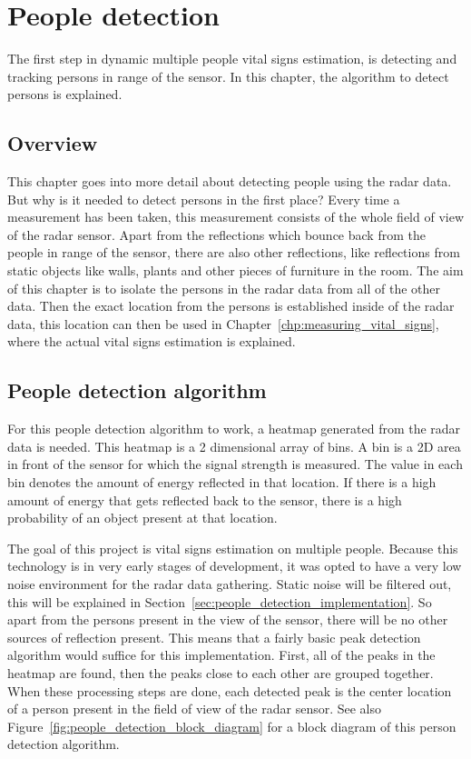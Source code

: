 \chapter{People detection}
\label{chp:people_detection}

The first step in dynamic multiple people vital signs estimation, is detecting and tracking persons in range of the sensor. In this chapter, the algorithm to detect persons is explained.

\section{Overview}
This chapter goes into more detail about detecting people using the radar data. But why is it needed to detect persons in the first place? Every time a measurement has been taken, this measurement consists of the whole field of view of the radar sensor. Apart from the reflections which bounce back from the people in range of the sensor, there are also other reflections, like reflections from static objects like walls, plants and other pieces of furniture in the room. The aim of this chapter is to isolate the persons in the radar data from all of the other data. Then the exact location from the persons is established inside of the radar data, this location can then be used in Chapter~\ref{chp:measuring_vital_signs}, where the actual vital signs estimation is explained.

\section{People detection algorithm}
For this people detection algorithm to work, a heatmap generated from the radar data is needed. This heatmap is a 2 dimensional array of bins. A bin is a 2D area in front of the sensor for which the signal strength is measured. The value in each bin denotes the amount of energy reflected in that location. If there is a high amount of energy that gets reflected back to the sensor, there is a high probability of an object present at that location. 

The goal of this project is vital signs estimation on multiple people. Because this technology is in very early stages of development, it was opted to have a very low noise environment for the radar data gathering. Static noise will be filtered out, this will be explained in Section~\ref{sec:people_detection_implementation}. So apart from the persons present in the view of the sensor, there will be no other sources of reflection present. This means that a fairly basic peak detection algorithm would suffice for this implementation. First, all of the peaks in the heatmap are found, then the peaks close to each other are grouped together. When these processing steps are done, each detected peak is the center location of a person present in the field of view of the radar sensor. See also Figure~\ref{fig:people_detection_block_diagram} for a block diagram of this person detection algorithm.

